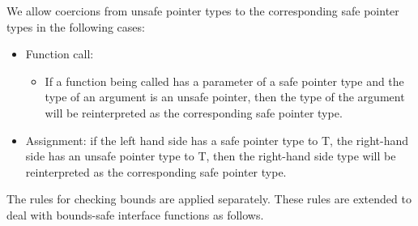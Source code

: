 We allow coercions from unsafe pointer types to the corresponding safe
pointer types in the following cases:

\begin{itemize}
\item
  Function call:

  \begin{itemize}
  \item
    If a function being called has a parameter of a safe pointer type
    and the type of an argument is an unsafe pointer, then the type of
    the argument will be reinterpreted as the corresponding safe pointer
    type.
  \end{itemize}
\item
  Assignment: if the left hand side has a safe pointer type to T, the
  right-hand side has an unsafe pointer type to T, then the right-hand
  side type will be reinterpreted as the corresponding safe pointer
  type.
\end{itemize}

The rules for checking bounds are applied separately. These rules are
extended to deal with bounds-safe interface functions as follows.

